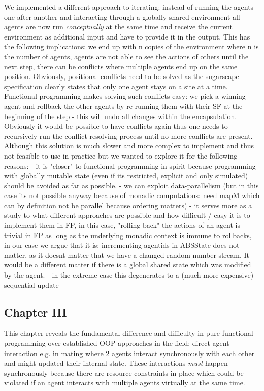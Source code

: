 We implemented a different approach to iterating: instead of running the agents one after another and interacting through a globally shared environment all agents are now run \textit{conceptually} at the same time and receive the current environment as additional input and have to provide it in the output. This has the following implications: we end up with n copies of the environment where n is the number of agents, agents are not able to see the actions of others until the next step, there can be conflicts where multiple agents end up on the same position. 
Obviously, positional conflicts need to be solved as the sugarscape specification clearly states that only one agent stays on a site at a time. Functional programming makes solving such conflicts easy: we pick a winning agent and rollback the other agents by re-running them with their SF at the beginning of the step - this will undo all changes within the encapsulation. Obviously it would be possible to have conflicts again thus one needs to recursively run the conflict-resolving process until no more conflicts are present.
Although this solution is much slower and more complex to implement and thus not feasible to use in practice but we wanted to explore it for the following reasons:
- it is "closer" to functional programming in spirit because programming with globally mutable state (even if its restricted, explicit and only simulated) should be avoided as far as possible.
- we can exploit data-parallelism (but in this case its not possible anyway because of monadic computations: need mapM which can by definition not be parallel because ordering matters)
- it serves more as a study to what different approaches are possible and how difficult / easy it is to implement them in FP, in this case, "rolling back" the actions of an agent is trivial in FP as long as the underlying monadic context is immune to rollbacks, in our case we argue that it is: incrementing agentids in ABSState does not matter, as it doesnt matter that we have a changed random-number stream. It would be a different matter if there is a global shared state which was modified by the agent.
- in the extreme case this degenerates to a (much more expensive) sequential update 

\subsection{Chapter III}
This chapter reveals the fundamental difference and difficulty in pure functional programming over established OOP approaches in the field: direct agent-interaction e.g. in mating where 2 agents interact synchronously with each other and might updated their internal state. These interactions \textit{must} happen synchronously because there are resource constraints in place which could be violated if an agent interacts with multiple agents virtually at the same time.

